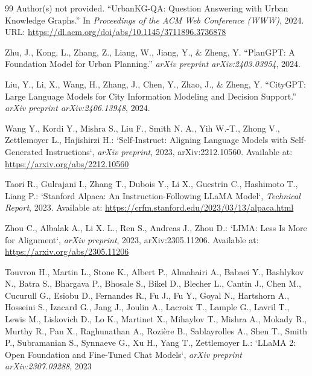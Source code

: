 \documentclass[a4paper,fleqn]{cas-sc}
\begin{document}
\begin{thebibliography}{99}
Author(s) not provided.  
``UrbanKG-QA: Question Answering with Urban Knowledge Graphs.''  
In \textit{Proceedings of the ACM Web Conference (WWW)}, 2024.  
URL: \url{https://dl.acm.org/doi/abs/10.1145/3711896.3736878}

Zhu, J., Kong, L., Zhang, Z., Liang, W., Jiang, Y., \& Zheng, Y.  
``PlanGPT: A Foundation Model for Urban Planning.''  
\textit{arXiv preprint arXiv:2403.03954}, 2024.

Liu, Y., Li, X., Wang, H., Zhang, J., Chen, Y., Zhao, J., \& Zheng, Y.
``CityGPT: Large Language Models for City Information Modeling and Decision Support.''  
\textit{arXiv preprint arXiv:2406.13948}, 2024.

Wang Y., Kordi Y., Mishra S., Liu F., Smith N. A., Yih W.-T., Zhong V., Zettlemoyer L., Hajishirzi H.:  
`Self-Instruct: Aligning Language Models with Self-Generated Instructions`, \textit{arXiv preprint}, 2023, arXiv:2212.10560. Available at: \url{https://arxiv.org/abs/2212.10560}

Taori R., Gulrajani I., Zhang T., Dubois Y., Li X., Guestrin C., Hashimoto T., Liang P.:  
`Stanford Alpaca: An Instruction-Following LLaMA Model`, \textit{Technical Report}, 2023. Available at: \url{https://crfm.stanford.edu/2023/03/13/alpaca.html}

Zhou C., Albalak A., Li X. L., Ren S., Andreas J., Zhou D.:  
`LIMA: Less Is More for Alignment`, \textit{arXiv preprint}, 2023, arXiv:2305.11206. Available at: \url{https://arxiv.org/abs/2305.11206}


Touvron H., Martin L., Stone K., Albert P., Almahairi A., Babaei Y., Bashlykov N., Batra S., Bhargava P., Bhosale S., Bikel D., Blecher L., Cantin J., Chen M., Cucurull G., Esiobu D., Fernandes R., Fu J., Fu Y., Goyal N., Hartshorn A., Hosseini S., Izacard G., Jang J., Joulin A., Lacroix T., Lample G., Lavril T., Lewis M., Liskovich D., Lo K., Martinet X., Mihaylov T., Mishra A., Mokady R., Murthy R., Pan X., Raghunathan A., Rozière B., Sablayrolles A., Shen T., Smith P., Subramanian S., Synnaeve G., Xu H., Yang T., Zettlemoyer L.:  
`LLaMA 2: Open Foundation and Fine-Tuned Chat Models`, \textit{arXiv preprint arXiv:2307.09288}, 2023


\end{thebibliography}
\end{document}
